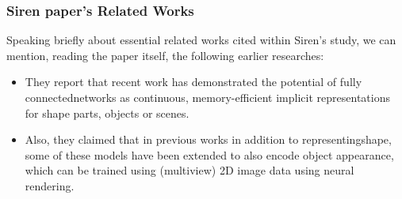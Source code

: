 



\begin{frame}
\frametitle{Siren paper's Related Works}
Speaking briefly about essential related works cited within Siren's study, we can mention, reading the paper itself, the following earlier researches:

\begin{itemize}
\item They report that recent work has demonstrated the potential of fully connectednetworks as continuous, memory-efficient implicit representations for shape parts, objects or scenes.
\item Also, they claimed that in previous works in addition to representingshape, some of these models have been extended to also encode object appearance, which can be trained using (multiview) 2D image data using neural rendering.
\end{itemize}

\end{frame}
